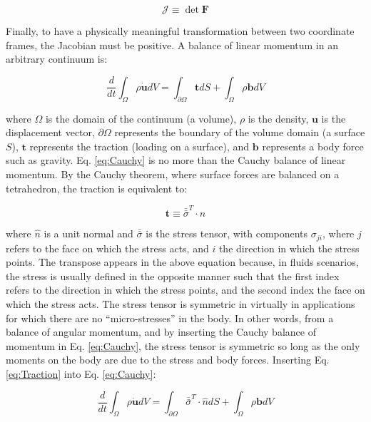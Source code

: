 \documentclass[10pt]{article}
\begin{document}
\begin{equation}
\label{eq:Jacobian}
\mathscr{J}\equiv \det{\textbf{F}}
\end{equation}

Finally, to have a physically meaningful transformation between two coordinate frames, the Jacobian must be positive. A balance of linear momentum in an arbitrary continuum is:

\begin{equation}
\label{eq:Cauchy}
\frac{d}{dt}\int_{\Omega}\rho\dot{\textbf{u}}dV=\int_{\partial\Omega}\textbf{t}dS+\int_{\Omega}\rho\textbf{b}dV
\end{equation}

where \(\Omega\) is the domain of the continuum (a volume), \(\rho\) is the density, \(\textbf{u}\) is the displacement vector, \(\partial\Omega\) represents the boundary of the volume domain (a surface \(S\)), \(\textbf{t}\) represents the traction (loading on a surface), and \(\textbf{b}\) represents a body force such as gravity. Eq. \eqref{eq:Cauchy} is no more than the Cauchy balance of linear momentum. By the Cauchy theorem, where surface forces are balanced on a tetrahedron, the traction is equivalent to:

\begin{equation}
\label{eq:Traction}
\textbf{t}\equiv\bar{\bar{\sigma}}^T\cdot\hat{n}
\end{equation}

where \(\hat{n}\) is a unit normal and \(\bar{\bar{\sigma}}\) is the stress tensor, with components \(\sigma_{ji}\), where \(j\) refers to the face on which the stress acts, and \(i\) the direction in which the stress points. The transpose appears in the above equation because, in fluids scenarios, the stress is usually defined in the opposite manner such that the first index refers to the direction in which the stress points, and the second index the face on which the stress acts. The stress tensor is symmetric in virtually in applications for which there are no ``micro-stresses'' in the body. In other words, from a balance of angular momentum, and by inserting the Cauchy balance of momentum in Eq. \eqref{eq:Cauchy}, the stress tensor is symmetric so long as the only moments on the body are due to the stress and body forces. Inserting Eq. \eqref{eq:Traction} into Eq. \eqref{eq:Cauchy}:

\begin{equation}
\label{eq:Cauchy2}
\frac{d}{dt}\int_{\Omega}\rho\dot{\textbf{u}}dV=\int_{\partial\Omega}\bar{\bar{\sigma}}^T\cdot\hat{n}dS+\int_{\Omega}\rho\textbf{b}dV
\end{equation}
\end{document}
